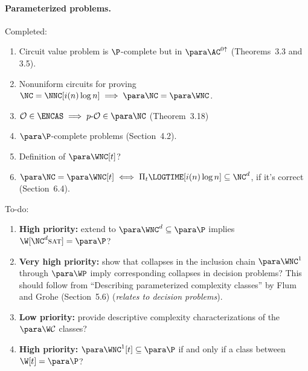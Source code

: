 \paragraph{Parameterized problems.}
Completed:
\begin{enumerate}
\item Circuit value problem is $\P$-complete but in $\para \AC^{0 \uparrow}$ (Theorems~3.3 and 3.5).
\item Nonuniform circuits for proving $\NC = \NNC[i(n) \log n] \implies \para \NC = \para \WNC$.
\item $\mathcal{O} \in \ENCAS \implies p \dash \mathcal{O} \in \para \NC$ (Theorem~3.18)
\item $\para \P$-complete problems (Section~4.2).
\item Definition of $\para \WNC[t]$?
\item $\para\NC = \para \WNC[t] \iff \Pi_t\LOGTIME[i(n) \log n] \subseteq \NC^d$, if it's correct (Section~6.4).
\end{enumerate}
To-do:
\begin{enumerate}
\item \textbf{High priority:} extend \autocite[Corollary~3.8]{est15} to $\para \WNC^d \subseteq \para \P$ implies $\W[\NC^d \textsc{sat}] = \para \P$?
\item \textbf{Very high priority:} show that collapses in the inclusion chain $\para \WNC^1$ through $\para \WP$ imply corresponding collapses in decision problems? This should follow from ``Describing parameterized complexity classes'' by Flum and Grohe (Section~5.6) (\emph{relates to decision problems}).
\item \textbf{Low priority:} provide descriptive complexity characterizations of the $\para \W \mathcal{C}$ classes?
\item \textbf{High priority:} $\para \WNC^1[t] \subseteq \para \P$ if and only if a class between $\W[t] = \para \P$?
\end{enumerate}
